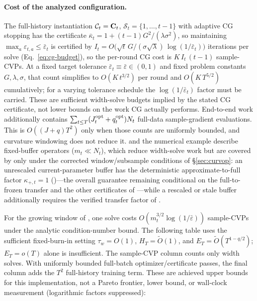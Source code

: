 \paragraph{Cost of the analyzed configuration.}
The full-history instantiation $\mathcal{C}_t=\mathbf{C}_t$,
$\mathcal{S}_t=\{1,\dots,t-1\}$ with adaptive CG stopping has
the certificate $\bar\kappa_t = 1+(t-1)G^2/(\lambda\sigma^2)$, so maintaining
$\max_a\varepsilon_{t,a}\le\bar\varepsilon_t$ is certified by
$I_t = O\bigl(\sqrt{t}\,G/(\sigma\sqrt{\lambda})\,
\log(1/\bar\varepsilon_t)\bigr)$ iterations per solve (Eq.~\eqref{eq:cg-budget}),
so the per-round CG cost is $K\,I_t\,(t-1)$ sample-CVPs.  At a fixed target
tolerance $\bar\varepsilon_t\equiv\bar\varepsilon\in(0,1)$ and fixed problem
constants $G,\lambda,\sigma$, that count simplifies to $O(K\,t^{3/2})$ per round
and $O(K\,T^{5/2})$ cumulatively; for a varying tolerance schedule the
$\log(1/\bar\varepsilon_t)$ factor must be carried.  These are sufficient
width-solve budgets implied by the stated CG certificate, not lower bounds on
the work CG actually performs.  End-to-end work additionally contains
$\sum_{t\le T}(J_t^{\rm opt}+q_t^{\rm opt})N_t$ full-data sample-gradient
evaluations.  This is $O((J+q)T^2)$ only when those counts are uniformly
bounded, and curvature windowing does not reduce it.
 and the numerical example describe fixed-buffer operators
($m_t\ll N_t$), which reduce width-solve work but are covered by
 only under the corrected window/subsample conditions of
\S\ref{sec:curvop}: an unrescaled current-parameter buffer has the deterministic
approximate-to-full factor $\kappa_{+,t}{=}1$ ()---the overall
guarantee remaining conditional on the full-to-frozen transfer and the other
certificates of ---while a rescaled or stale buffer additionally
requires the verified transfer factor of .

For the growing window of , one solve costs
$O(m_t^{3/2}\log(1/\bar\varepsilon))$ sample-CVPs under the analytic
condition-number bound.  The following table uses the sufficient fixed-burn-in
setting $\tau_w=O(1)$, $H_T=\widetilde O(1)$, and
$E_T=\widetilde O(T^{1-q/2})$; $E_T=o(T)$ alone is insufficient.  The
sample-CVP column counts only width solves.  With uniformly bounded full-batch
optimizer/certificate passes, the final column adds the $T^2$ full-history
training term.  These are achieved upper bounds for this implementation, not a
Pareto frontier, lower bound, or wall-clock measurement (logarithmic factors
suppressed):


